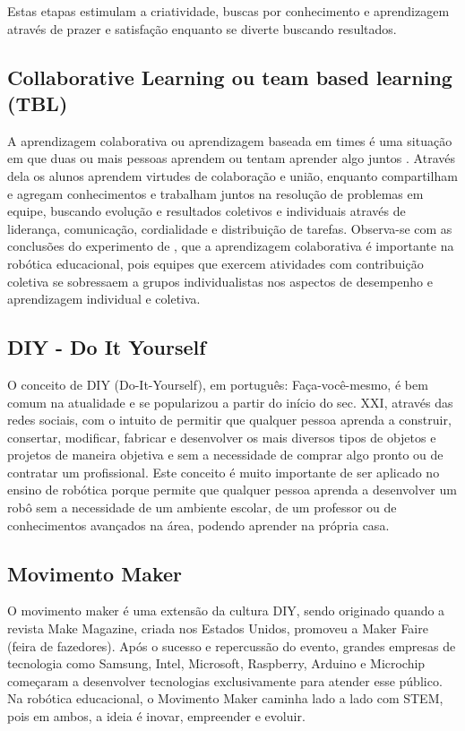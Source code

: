 Estas etapas estimulam a criatividade, buscas por conhecimento e aprendizagem através de prazer e satisfação enquanto se diverte buscando resultados.

\subsection{Collaborative Learning ou team based learning (TBL)}\label{sec:tbl} 
A aprendizagem colaborativa ou aprendizagem baseada em times é uma situação em que duas ou mais pessoas aprendem ou tentam aprender algo juntos \cite{dillenbourg}. Através dela os alunos aprendem virtudes de colaboração e união, enquanto compartilham e agregam conhecimentos e trabalham juntos na resolução de problemas em equipe, buscando evolução e resultados coletivos e individuais através de liderança, comunicação, cordialidade e distribuição de tarefas. Observa-se com as conclusões do experimento de \cite{karahoca}, que a aprendizagem colaborativa é importante na robótica educacional, pois equipes que exercem atividades com contribuição coletiva se sobressaem a grupos individualistas nos aspectos de desempenho e aprendizagem individual e coletiva. 

\subsection{DIY - Do It Yourself}\label{sec:diy}
O conceito de DIY (Do-It-Yourself), em português: Faça-você-mesmo, é bem comum na atualidade e se popularizou a partir do início do sec. XXI, através das redes sociais, com o intuito de permitir que qualquer pessoa aprenda a construir, consertar, modificar, fabricar e desenvolver os mais diversos tipos de objetos e projetos de maneira objetiva e sem a necessidade de comprar algo pronto ou de contratar um profissional. Este conceito é muito importante de ser aplicado no ensino de robótica porque permite que qualquer pessoa aprenda a desenvolver um robô sem a necessidade de um ambiente escolar, de um professor ou de conhecimentos avançados na área, podendo aprender na própria casa.

\subsection{Movimento Maker}\label{sec:maker} 
O movimento maker é uma extensão da cultura DIY, sendo originado quando a revista Make Magazine, criada nos Estados Unidos, promoveu a Maker Faire (feira de fazedores). Após o sucesso e repercussão do evento, grandes empresas de tecnologia como Samsung, Intel, Microsoft, Raspberry, Arduino e Microchip começaram a desenvolver tecnologias exclusivamente para atender esse público. Na robótica educacional, o Movimento Maker caminha lado a lado com STEM, pois em ambos, a ideia é inovar, empreender e evoluir. 

